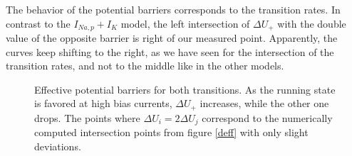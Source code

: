 \documentclass[12pt,a4paper]{article}
\begin{document}
The behavior of the potential barriers corresponds to the transition rates. In contrast to the $I_{Na,p}+I_K$ model, the left intersection of $\Delta U_+$ with the double value of the opposite barrier is right of our measured point. Apparently, the curves keep shifting to the right, as we have seen for the intersection of the transition rates, and not to the middle like in the other models.
\begin{figure}[H]
	\hspace*{-0.5cm}
	\caption{Effective potential barriers for both transitions. As the running state is favored at high bias currents, $\Delta U_+$ increases, while the other one drops. The points where $\Delta U_i=2\Delta U_j$ correspond to the numerically computed intersection points from figure \ref{deff} with only slight deviations.}
\end{figure}
\end{document}
